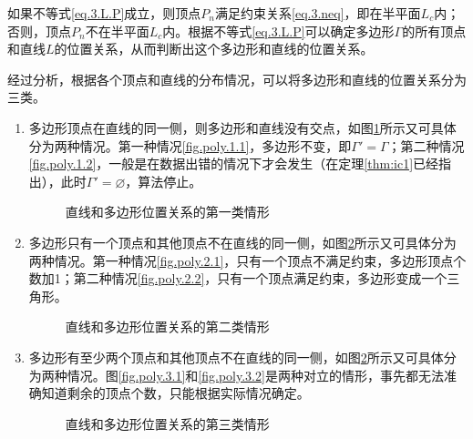 如果不等式\eqref{eq.3.L.P}成立，则顶点$P_{n}$满足约束关系\eqref{eq.3.neq}，即在半平面$L_{c}$内；否则，顶点$P_{n}$不在半平面$L_{c}$内。根据不等式\eqref{eq.3.L.P}可以确定多边形$\Gamma$的所有顶点和直线$L$的位置关系，从而判断出这个多边形和直线的位置关系。

经过分析，根据各个顶点和直线的分布情况，可以将多边形和直线的位置关系分为三类。
\begin{enumerate}
\item 多边形顶点在直线的同一侧，则多边形和直线没有交点，如图\ref{fig.3.beta.l.1}所示又可具体分为两种情况。第一种情况\ref{fig.poly.1.1}，多边形不变，即$\Gamma'=\Gamma$；第二种情况\ref{fig.poly.1.2}，一般是在数据出错的情况下才会发生（在定理\eqref{thm:ic1}已经指出），此时$\Gamma'=\varnothing$，算法停止。
\begin{figure}[htp]
	\centering
	\caption{直线和多边形位置关系的第一类情形}	 %
	\label{fig.3.beta.l.1}	 %
\end{figure}
\item 多边形只有一个顶点和其他顶点不在直线的同一侧，如图\ref{fig.3.beta.l.2}所示又可具体分为两种情况。第一种情况\ref{fig.poly.2.1}，只有一个顶点不满足约束，多边形顶点个数加1；第二种情况\ref{fig.poly.2.2}，只有一个顶点满足约束，多边形变成一个三角形。
\begin{figure}[htp]
	\centering
	\caption{直线和多边形位置关系的第二类情形}	 %
	\label{fig.3.beta.l.2}	 %
\end{figure}
\item 多边形有至少两个顶点和其他顶点不在直线的同一侧，如图\ref{fig.3.beta.l.2}所示又可具体分为两种情况。图\ref{fig.poly.3.1}和\ref{fig.poly.3.2}是两种对立的情形，事先都无法准确知道剩余的顶点个数，只能根据实际情况确定。
\begin{figure}[htp]
	\centering
	\caption{直线和多边形位置关系的第三类情形}	 %
	\label{fig.3.beta.l.3}	 %
\end{figure}
\end{enumerate}

